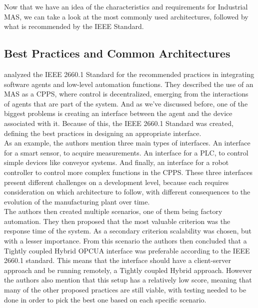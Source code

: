 Now that we have an idea of the characteristics and requirements for Industrial \gls{MAS}, we can take a look at the most commonly used architectures, followed by what is recommended by the IEEE Standard.

\subsection{Best Practices and Common Architectures}
\label{subsec:best_practices_and_common_architectures}

\citeauthor{Leitao2021} \cite{Leitao2021} analyzed the IEEE 2660.1 Standard for the recommended practices in integrating software agents and low-level automation functions. They described the use of an \gls{MAS} as a \gls{CPPS}, where control is decentralized, emerging from the interactions of agents that are part of the system. And as we've discussed before, one of the biggest problems is creating an interface between the agent and the device associated with it. Because of this, the IEEE 2660.1 Standard was created, defining the best practices in designing an appropriate interface.\\

As an example, the authors mention three main types of interfaces. An interface for a smart sensor, to acquire measurements. An interface for a \gls{PLC}, to control simple devices like conveyor systems. And finally, an interface for a robot controller to control more complex functions in the \gls{CPPS}. These three interfaces present different challenges on a development level, because each requires consideration on which architecture to follow, with different consequences to the evolution of the manufacturing plant over time.\\

The authors then created multiple scenarios, one of them being factory automation. They then proposed that the most valuable criterion was the response time of the system. As a secondary criterion scalability was chosen, but with a lesser importance. From this scenario the authors then concluded that a Tightly coupled Hybrid \gls{OPCUA} interface was preferable according to the IEEE 2660.1 standard. This means that the interface should have a client-server approach and be running remotely, a Tightly coupled Hybrid approach. However the authors also mention that this setup has a relatively low score, meaning that many of the other proposed practices are still viable, with testing needed to be done in order to pick the best one based on each specific scenario.\\


